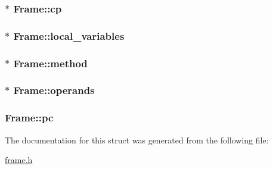 \subsubsection[{\texorpdfstring{cp}{cp}}]{$\ast$ Frame\+::cp}\hypertarget{structFrame_ada1bd832b6f72f87a35d88c68b9a188a}{}\label{structFrame_ada1bd832b6f72f87a35d88c68b9a188a}
\subsubsection[{\texorpdfstring{local\+\_\+variables}{local_variables}}]{$\ast$ Frame\+::local\+\_\+variables}\hypertarget{structFrame_a1a3968ae645e9c154229a2631639ebd5}{}\label{structFrame_a1a3968ae645e9c154229a2631639ebd5}
\subsubsection[{\texorpdfstring{method}{method}}]{$\ast$ Frame\+::method}\hypertarget{structFrame_af0943cac72b53aa5aa67f3e7097430a1}{}\label{structFrame_af0943cac72b53aa5aa67f3e7097430a1}
\subsubsection[{\texorpdfstring{operands}{operands}}]{$\ast$ Frame\+::operands}\hypertarget{structFrame_ab311fc7762ab460f039e58b024c4d229}{}\label{structFrame_ab311fc7762ab460f039e58b024c4d229}
\subsubsection[{\texorpdfstring{pc}{pc}}]{ Frame\+::pc}\hypertarget{structFrame_ada6a6cf76d00cbadf43a86a686dd026c}{}\label{structFrame_ada6a6cf76d00cbadf43a86a686dd026c}


The documentation for this struct was generated from the following file\+:\begin{DoxyCompactItemize}
\item 
\hyperlink{frame_8h}{frame.\+h}\end{DoxyCompactItemize}
